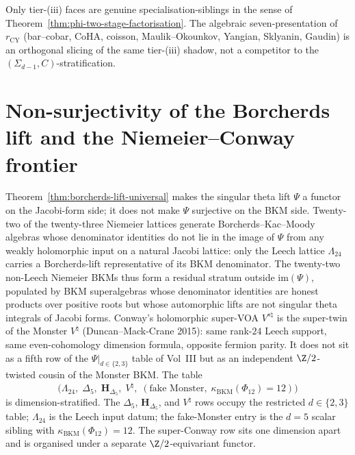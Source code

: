 Only tier-(iii) faces are genuine specialisation-siblings in
the sense of Theorem~\ref{thm:phi-two-stage-factorisation}.
The algebraic seven-presentation of $r_{\mathrm{CY}}$
(bar--cobar, CoHA, coisson, Maulik--Okounkov, Yangian, Sklyanin,
Gaudin) is an orthogonal slicing of the same tier-(iii) shadow,
not a competitor to the $(\Sigma_{d-1}, C)$-stratification.

\section{Non-surjectivity of the Borcherds lift and the Niemeier--Conway frontier}
\label{sec:psi-nonsurjective}

Theorem~\ref{thm:borcherds-lift-universal} makes the singular theta
lift $\Psi$ a functor on the Jacobi-form side; it does not make $\Psi$
surjective on the BKM side. Twenty-two of the twenty-three Niemeier
lattices generate Borcherds--Kac--Moody algebras whose denominator
identities do not lie in the image of $\Psi$ from any weakly
holomorphic input on a natural Jacobi lattice: only the Leech lattice
$\Lambda_{24}$ carries a Borcherds-lift representative of its BKM
denominator. The twenty-two non-Leech Niemeier BKMs thus form a
residual stratum outside $\mathrm{im}(\Psi)$, populated by BKM
superalgebras whose denominator identities are honest products over
positive roots but whose automorphic lifts are not singular theta
integrals of Jacobi forms.
Conway's holomorphic super-VOA $V^{s\natural}$ is the super-twin of
the Monster $V^\natural$ (Duncan--Mack-Crane 2015): same rank-$24$
Leech support, same even-cohomology dimension formula, opposite
fermion parity. It does not sit as a fifth row of the $\Psi|_{d\in\{2,3\}}$
table of Vol~III but as an independent $\Z/2$-twisted cousin of the
Monster BKM. The table
\[
 \bigl(
 \Lambda_{24},\;\Delta_5,\;\mathbf{H}_{\Delta_5},\;V^\natural,\;
 (\text{fake Monster},\;\kappa_{\mathrm{BKM}}(\Phi_{12})=12)
 \bigr)
\]
is dimension-stratified. The $\Delta_5$, $\mathbf{H}_{\Delta_5}$,
and $V^\natural$ rows occupy the restricted $d\in\{2,3\}$ table;
$\Lambda_{24}$ is the Leech input datum; the fake-Monster entry is
the $d=5$ scalar sibling with
$\kappa_{\mathrm{BKM}}(\Phi_{12})=12$. The super-Conway row sits one
dimension apart and is organised under a separate
$\Z/2$-equivariant functor.

